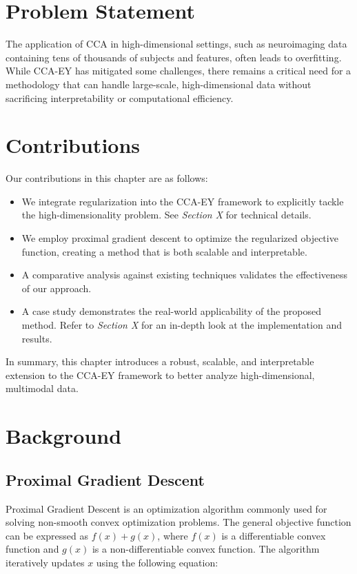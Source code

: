 \section{Problem Statement}

The application of CCA in high-dimensional settings, such as neuroimaging data containing tens of thousands of subjects and features, often leads to overfitting.
While CCA-EY has mitigated some challenges, there remains a critical need for a methodology that can handle large-scale, high-dimensional data without sacrificing interpretability or computational efficiency.


\section{Contributions}

Our contributions in this chapter are as follows:

\begin{itemize}
    \item We integrate regularization into the CCA-EY framework to explicitly tackle the high-dimensionality problem. See \textit{Section X} for technical details.
    \item We employ proximal gradient descent to optimize the regularized objective function, creating a method that is both scalable and interpretable.
    \item A comparative analysis against existing techniques validates the effectiveness of our approach.
    \item A case study demonstrates the real-world applicability of the proposed method. Refer to \textit{Section X} for an in-depth look at the implementation and results.
\end{itemize}

In summary, this chapter introduces a robust, scalable, and interpretable extension to the CCA-EY framework to better analyze high-dimensional, multimodal data.


\section{Background}

\subsection{Proximal Gradient Descent}

Proximal Gradient Descent is an optimization algorithm commonly used for solving non-smooth convex optimization problems.
The general objective function can be expressed as \( f(x) + g(x) \), where \( f(x) \) is a differentiable convex function and \( g(x) \) is a non-differentiable convex function.
The algorithm iteratively updates \( x \) using the following equation:

